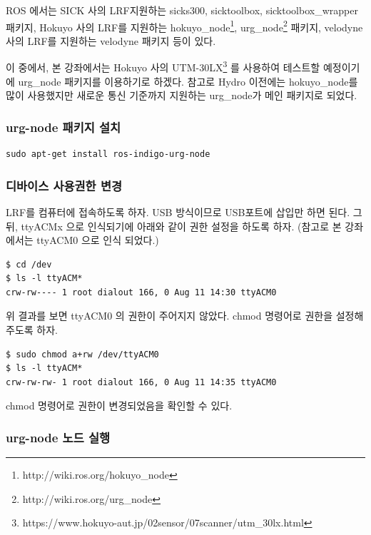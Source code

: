 ROS 에서는 SICK 사의 LRF지원하는 sicks300, sicktoolbox, sicktoolbox\_wrapper 패키지, Hokuyo 사의 LRF를 지원하는 hokuyo\_node\footnote{http://wiki.ros.org/hokuyo\_node}, urg\_node\footnote{http://wiki.ros.org/urg\_node} 패키지, velodyne 사의 LRF를 지원하는 velodyne 패키지 등이 있다.

이 중에서, 본 강좌에서는 Hokuyo 사의 UTM-30LX\footnote{https://www.hokuyo-aut.jp/02sensor/07scanner/utm\_30lx.html} 를 사용하여 테스트할 예정이기에 urg\_node 패키지를 이용하기로 하겠다. 참고로 Hydro 이전에는 hokuyo\_node를 많이 사용했지만 새로운 통신 기준까지 지원하는 urg\_node가 메인 패키지로 되었다.

\subsubsection{urg-node 패키지 설치}

\begin{lstlisting}[language=ROS]
sudo apt-get install ros-indigo-urg-node 
\end{lstlisting}

\subsubsection{디바이스 사용권한 변경}

LRF를 컴퓨터에 접속하도록 하자. USB 방식이므로 USB포트에 삽입만 하면 된다. 그 뒤, ttyACMx 으로 인식되기에 아래와 같이 권한 설정을 하도록 하자. (참고로 본 강좌에서는 ttyACM0 으로 인식 되었다.)

\begin{lstlisting}[language=ROS]
$ cd /dev
$ ls -l ttyACM*
crw-rw---- 1 root dialout 166, 0 Aug 11 14:30 ttyACM0
\end{lstlisting}

위 결과를 보면 ttyACM0 의 권한이 주어지지 않았다. chmod 명령어로 권한을 설정해 주도록 하자.

\begin{lstlisting}[language=ROS]
$ sudo chmod a+rw /dev/ttyACM0
$ ls -l ttyACM*
crw-rw-rw- 1 root dialout 166, 0 Aug 11 14:35 ttyACM0
\end{lstlisting}

\noindent
chmod 명령어로 권한이 변경되었음을 확인할 수 있다.

\subsubsection{urg-node 노드 실행}

